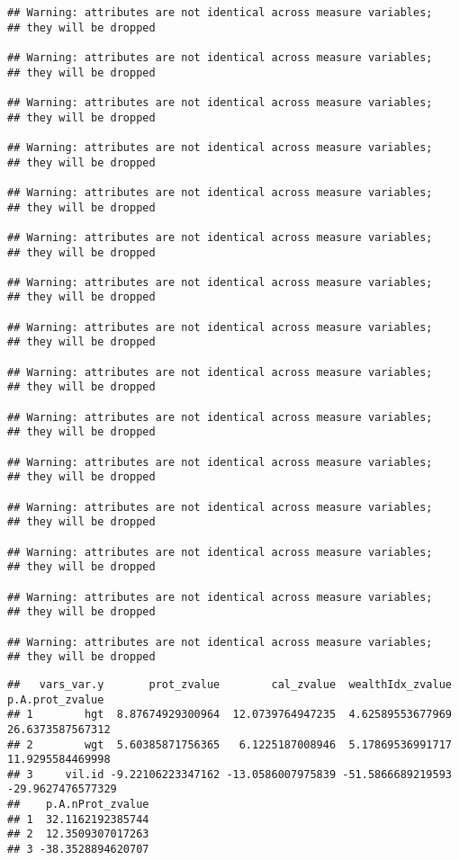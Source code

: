 \documentclass[
]{book}
\begin{document}
\begin{verbatim}
## Warning: attributes are not identical across measure variables;
## they will be dropped

## Warning: attributes are not identical across measure variables;
## they will be dropped

## Warning: attributes are not identical across measure variables;
## they will be dropped

## Warning: attributes are not identical across measure variables;
## they will be dropped

## Warning: attributes are not identical across measure variables;
## they will be dropped

## Warning: attributes are not identical across measure variables;
## they will be dropped

## Warning: attributes are not identical across measure variables;
## they will be dropped

## Warning: attributes are not identical across measure variables;
## they will be dropped

## Warning: attributes are not identical across measure variables;
## they will be dropped

## Warning: attributes are not identical across measure variables;
## they will be dropped

## Warning: attributes are not identical across measure variables;
## they will be dropped

## Warning: attributes are not identical across measure variables;
## they will be dropped

## Warning: attributes are not identical across measure variables;
## they will be dropped

## Warning: attributes are not identical across measure variables;
## they will be dropped

## Warning: attributes are not identical across measure variables;
## they will be dropped
\end{verbatim}

\begin{verbatim}
##   vars_var.y       prot_zvalue        cal_zvalue  wealthIdx_zvalue   p.A.prot_zvalue
## 1        hgt  8.87674929300964  12.0739764947235  4.62589553677969  26.6373587567312
## 2        wgt  5.60385871756365   6.1225187008946  5.17869536991717  11.9295584469998
## 3     vil.id -9.22106223347162 -13.0586007975839 -51.5866689219593 -29.9627476577329
##    p.A.nProt_zvalue
## 1  32.1162192385744
## 2  12.3509307017263
## 3 -38.3528894620707
\end{verbatim}
\end{document}
